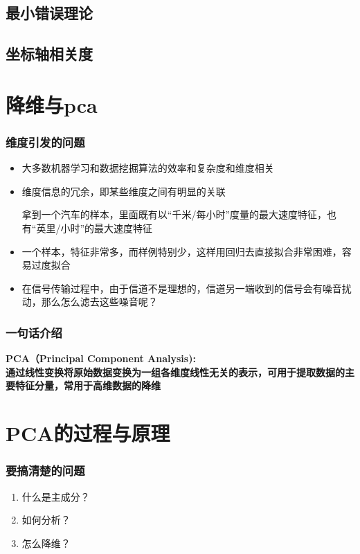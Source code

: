 \subsection{最小错误理论}

\subsection{坐标轴相关度}


\section{降维与pca}
\begin{frame}
\frametitle{维度引发的问题}
\begin{itemize}
		 \item 大多数机器学习和数据挖掘算法的效率和复杂度和维度相关
	       \hilite <2> \item 维度信息的冗余，即某些维度之间有明显的关联
	       	\begin{example}
	   拿到一个汽车的样本，里面既有以“千米/每小时”度量的最大速度特征，也有“英里/小时”的最大速度特征
	\end{example}
	  \item 一个样本，特征非常多，而样例特别少，这样用回归去直接拟合非常困难，容易过度拟合
	 \hilite <4> \item 在信号传输过程中，由于信道不是理想的，信道另一端收到的信号会有噪音扰动，那么怎么滤去这些噪音呢？
	\end{itemize}
\end{frame}
\begin{frame}
\frametitle{一句话介绍}
 \bf{PCA（Principal Component Analysis):}\\
 通过线性变换将原始数据变换为一组各维度\color{red}线性无关\color{black}的表示，可用于提取数据的\color{red}主要特征分量\color{black}，常用于高维数据的\color{red}降维\color{black}
 \end{frame}
 



\section{PCA的过程与原理}
\begin{frame}
\frametitle{要搞清楚的问题}
  \begin{enumerate}
		  \item 什么是主成分？
		  \item 如何分析？
		  \item 怎么降维？
 \end{enumerate}
 \end{frame}
 

